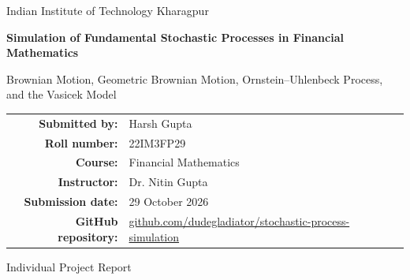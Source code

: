 \documentclass[11pt,a4paper]{article}
\begin{document}
\begin{titlepage}
  \centering
  \vspace*{1.4cm}
  {\Large Indian Institute of Technology Kharagpur\par}
  \vspace{1.8cm}
  {\Huge\bfseries Simulation of Fundamental Stochastic Processes in Financial Mathematics\par}
  \vspace{0.8cm}
  {\Large Brownian Motion, Geometric Brownian Motion, Ornstein--Uhlenbeck Process, and the Vasicek Model\par}
  \vfill
  \begin{tabular}{rl}
    \textbf{Submitted by:} & Harsh Gupta\\[0.3em]
    \textbf{Roll number:} & 22IM3FP29\\[0.3em]
    \textbf{Course:} & Financial Mathematics\\[0.3em]
    \textbf{Instructor:} & Dr. Nitin Gupta\\[0.3em]
    \textbf{Submission date:} & 29 October 2026\\[0.3em]
    \textbf{GitHub repository:} & \href{https://github.com/dudegladiator/stochastic-process-simulation}{github.com/dudegladiator/stochastic-process-simulation}
  \end{tabular}
  \vfill
  {\large Individual Project Report\par}
\end{titlepage}

\tableofcontents
\newpage

\begin{abstract}
This report studies four continuous-time stochastic processes used in financial mathematics: standard Brownian motion, geometric Brownian motion (GBM), the Ornstein--Uhlenbeck (OU) process, and the Vasicek short-rate model. For each process, its stochastic differential equation, distributional properties, exact discrete-time transition, financial interpretation, and limitations are presented. Reproducible Monte Carlo simulations use 252 time steps over a one-year horizon and fixed pseudo-random seeds. Sample paths illustrate continuity, multiplicative growth, and mean reversion, while terminal histograms are compared with their theoretical densities. The close agreement between empirical and theoretical moments provides a numerical consistency check for the implementation. The report also explains that the Vasicek model is mathematically an OU process, although its state variable and financial interpretation are specifically those of a short-term interest rate.
\end{abstract}
\end{document}
